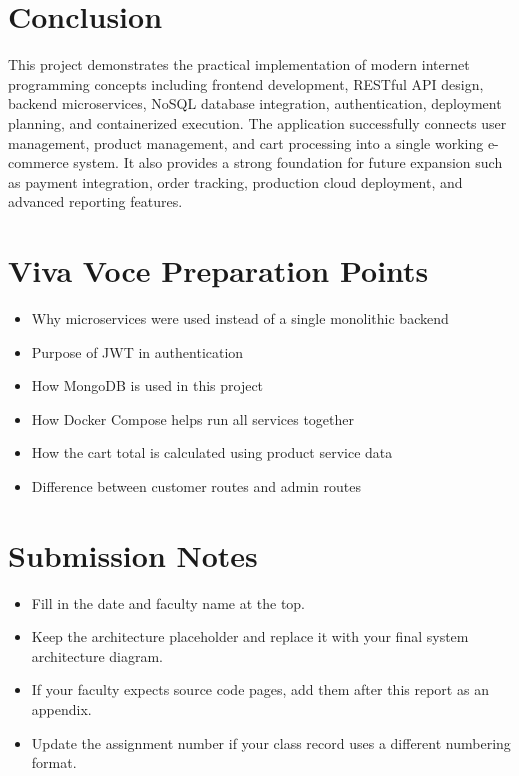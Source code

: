 \documentclass[12pt,a4paper]{article}
\begin{document}
\section{Conclusion}
This project demonstrates the practical implementation of modern internet programming concepts including frontend development, RESTful API design, backend microservices, NoSQL database integration, authentication, deployment planning, and containerized execution. The application successfully connects user management, product management, and cart processing into a single working e-commerce system. It also provides a strong foundation for future expansion such as payment integration, order tracking, production cloud deployment, and advanced reporting features.

\section*{Viva Voce Preparation Points}
\begin{itemize}[leftmargin=1.5cm]
    \item Why microservices were used instead of a single monolithic backend
    \item Purpose of JWT in authentication
    \item How MongoDB is used in this project
    \item How Docker Compose helps run all services together
    \item How the cart total is calculated using product service data
    \item Difference between customer routes and admin routes
\end{itemize}

\section*{Submission Notes}
\begin{itemize}[leftmargin=1.5cm]
    \item Fill in the date and faculty name at the top.
    \item Keep the architecture placeholder and replace it with your final system architecture diagram.
    \item If your faculty expects source code pages, add them after this report as an appendix.
    \item Update the assignment number if your class record uses a different numbering format.
\end{itemize}
\end{document}
